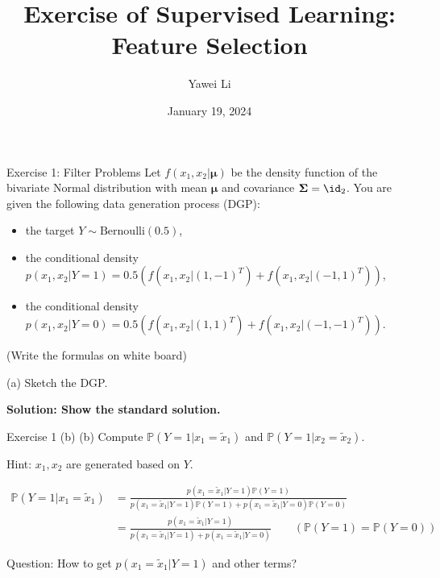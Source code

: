 \documentclass[aspectratio=169]{beamer}
\title[]{\textbf{Exercise of Supervised Learning:\\Feature Selection}}
\author{Yawei Li}
\institute[LMU]
{
\\
  \texttt{yawei.li@stat.uni-muenchen.de}
}
\date{January 19, 2024}
\newcommand{\prob}[1]{\mathbb{P}\left(#1\right)}
\newcommand{\xone}{x_1}
\newcommand{\xtwo}{x_2}
\newcommand{\txone}{\tilde{x}_1}
\newcommand{\txtwo}{\tilde{x}_2}
\begin{document}
\begin{frame}
\titlepage

\end{frame}


\begin{frame}{Exercise 1: Filter Problems}
	Let $f(x_1, x_2| \bm{\mu})$ be the density function of the bivariate Normal distribution with mean $\bm{\mu}$ and covariance $\bm{\Sigma} = \id_2$. You are given the following data generation process (DGP):
	\begin{itemize}
		\item the target $Y \sim \mathrm{Bernoulli}(0.5)$,
		\item the conditional density $p(x_1, x_2 | Y=1) = 0.5 (f(x_1, x_2 | (1, -1 )^T) + f(x_1, x_2 |(-1, 1)^T))$,
		\item the conditional density $p(x_1, x_2 | Y=0) = 0.5 (f(x_1, x_2 | (1, 1)^T) + f(x_1, x_2 | (-1, -1)^T))$.
	\end{itemize}
	(Write the formulas on white board)
	
	(a) Sketch the DGP.
	
	\textbf{Solution: Show the standard solution.}
\end{frame}

\begin{frame}{Exercise 1 (b)}
	(b) Compute $\prob{Y=1 | \xone = \txone}$ and $\prob{Y=1 | \xtwo = \txtwo}$.
	\vspace{5pt}
	
	Hint: $\xone, \xtwo$ are generated based on $Y$.
	
	\begin{align*}
		\prob{Y=1 | \xone = \txone} &= \frac{p(\xone = \txone | Y=1) \prob{Y=1}}{p(\xone = \txone | Y=1) \prob{Y=1} + p(\xone = \txone | Y = 0) \prob{Y=0}} \\
		&= \frac{p(\xone = \txone | Y=1)}{p(\xone = \txone | Y=1) + p(\xone = \txone | Y = 0) } \qquad (\prob{Y=1} = \prob{Y=0})
	\end{align*}
	
	Question: How to get $p(\xone = \txone | Y=1)$ and other terms?
	
\end{frame}
\end{document}
